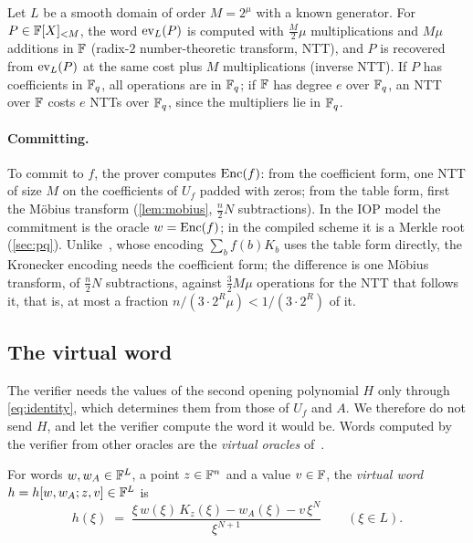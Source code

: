 \begin{fact}\label{fact:ntt}
Let $L$ be a smooth domain of order $M = 2^\mu$ with a known generator. For $P \in \mathbb{F}[X]_{<M}$, the word $\mathrm{ev}_L(P)$ is computed with $\tfrac{M}{2}\mu$ multiplications and $M\mu$ additions in $\mathbb{F}$ (radix-$2$ number-theoretic transform, NTT), and $P$ is recovered from $\mathrm{ev}_L(P)$ at the same cost plus $M$ multiplications (inverse NTT).
If $P$ has coefficients in $\mathbb{F}_q$, all operations are in $\mathbb{F}_q$; if $\mathbb{F}$ has degree $e$ over $\mathbb{F}_q$, an NTT over $\mathbb{F}$ costs $e$ NTTs over $\mathbb{F}_q$, since the multipliers lie in $\mathbb{F}_q$.
\end{fact}

\paragraph{Committing.}
To commit to $f$, the prover computes $\mathrm{Enc}(f)$: from the coefficient form, one NTT of size $M$ on the coefficients of $U_f$ padded with zeros; from the table form, first the M\"obius transform (\cref{lem:mobius}, $\tfrac n2 N$ subtractions).
In the IOP model the commitment is the oracle $w = \mathrm{Enc}(f)$; in the compiled scheme it is a Merkle root (\cref{sec:pq}).
Unlike~\cite{Mkh26}, whose encoding $\sum_b f(b) K_b$ uses the table form directly, the Kronecker encoding needs the coefficient form; the difference is one M\"obius transform, of $\tfrac n2 N$ subtractions, against $\tfrac32 M\mu$ operations for the NTT that follows it, that is, at most a fraction $n/(3 \cdot 2^R \mu) < 1/(3 \cdot 2^R)$ of it.

\subsection{The virtual word}\label{sec:scheme:virtual}

The verifier needs the values of the second opening polynomial $H$ only through \eqref{eq:identity}, which determines them from those of $U_f$ and $A$. We therefore do not send $H$, and let the verifier compute the word it would be.
Words computed by the verifier from other oracles are the \emph{virtual oracles} of~\cite{BCRSVW19}.

\begin{definition}\label{def:virtual}
For words $w, w_A \in \mathbb{F}^L$, a point $z \in \mathbb{F}^n$ and a value $v \in \mathbb{F}$, the \emph{virtual word} $h = h[w, w_A; z, v] \in \mathbb{F}^L$ is
\[
  h(\xi) \;=\; \frac{\xi\, w(\xi)\, K_z(\xi) - w_A(\xi) - v\,\xi^N}{\xi^{N+1}} \qquad (\xi \in L).
\]
\end{definition}

